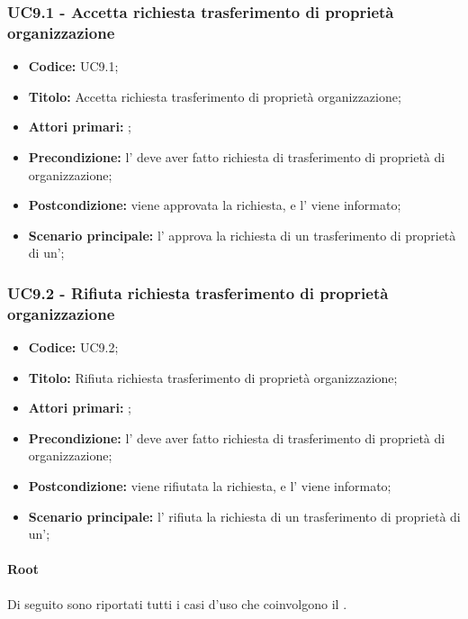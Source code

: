 \documentclass[casi-duso]{subfiles}
\begin{document}
\subsubsection{UC9.1 - Accetta richiesta trasferimento di proprietà organizzazione}
\label{subsub:UC9.1}
\begin{itemize}
  \item \textbf{Codice:} UC9.1;
  \item \textbf{Titolo:} Accetta richiesta trasferimento di proprietà organizzazione;
  \item \textbf{Attori primari:} ;
  \item \textbf{Precondizione:} l' deve aver fatto richiesta di trasferimento di proprietà di organizzazione;
  \item \textbf{Postcondizione:} viene approvata la richiesta, e l' viene informato;
  \item \textbf{Scenario principale:} l' approva la richiesta di un trasferimento di proprietà di un';
\end{itemize}

\subsubsection{UC9.2 - Rifiuta richiesta trasferimento di proprietà organizzazione}
\label{subsub:UC9.2}
\begin{itemize}
  \item \textbf{Codice:} UC9.2;
  \item \textbf{Titolo:} Rifiuta richiesta trasferimento di proprietà organizzazione;
  \item \textbf{Attori primari:} ;
  \item \textbf{Precondizione:} l' deve aver fatto richiesta di trasferimento di proprietà di organizzazione;
  \item \textbf{Postcondizione:} viene rifiutata la richiesta, e l' viene informato;
  \item \textbf{Scenario principale:} l' rifiuta la richiesta di un trasferimento di proprietà di un';
\end{itemize}


\paragraph{Root}
Di seguito sono riportati tutti i casi d'uso che coinvolgono il  .
\end{document}
